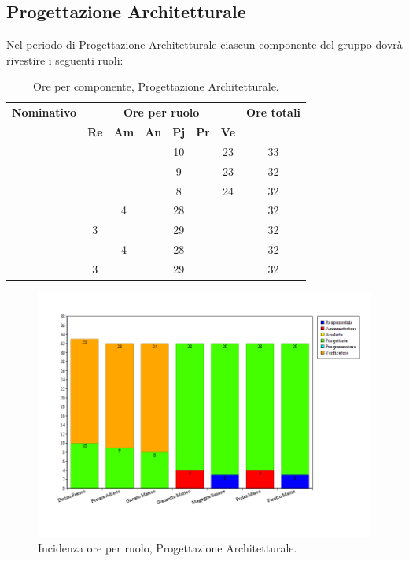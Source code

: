 \subsection{Progettazione Architetturale}
Nel periodo di Progettazione Architetturale ciascun componente del gruppo dovrà rivestire i seguenti ruoli:
\begin{table}[H]
	\begin{center}
		\begin{tabular}{|c|c|c|c|c|c|c|c|}
			\hline
			\textbf{Nominativo} & \multicolumn{6}{c|}{\textbf{Ore per ruolo}} & \textbf{Ore totali} \\
			& \textbf{Re} & \textbf{Am} & \textbf{An} & \textbf{Pj} & \textbf{Pr} & \textbf{Ve} & \\
			\hline
			\FB		&		&		&		&	10	&		&	23	&	33	\\
			\hline
			\AF	&		&		&		&	9 	&		&	23	& 	32	\\
			\hline
			\GN		&		&		&		&	8	&		&	24	&	32	\\
			\hline									
			\GR	&		&	 4	&  		&	28	&	 	& 		&	32	\\
			\hline
			\SM 		&	3	&		&		&	29	&		& 		&	32	\\
			\hline
			\MP 		& 		&	4	&		&	28	&		&		&	32	\\
			\hline						
			\MV 		&	3	&		&		&	29	&		&		& 	32	\\
			\hline
		\end{tabular}
	\end{center}
	\caption{Ore per componente, Progettazione Architetturale.}
\end{table}

\begin{figure}[H]
	\centering
	\includegraphics[scale=0.4]{immagini/Grafi/GrafoPA}
	\caption{Incidenza ore per ruolo, Progettazione Architetturale.}
\end{figure}

